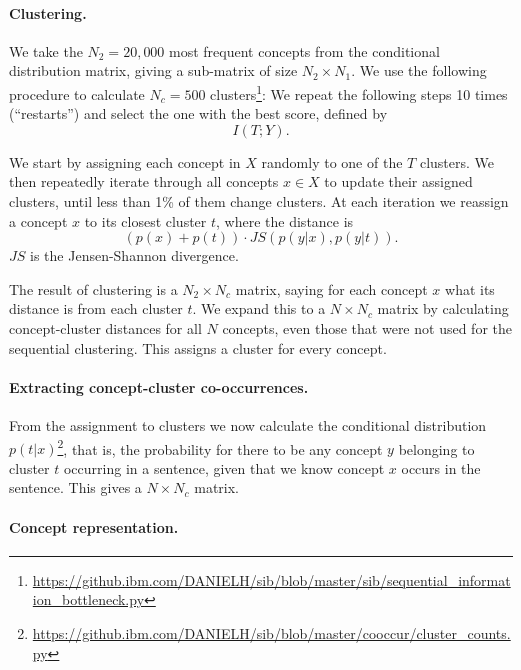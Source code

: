 \documentclass{article}
\begin{document}
    \paragraph{Clustering.}

    We take the $N_2=20,000$ most frequent concepts from the
    conditional distribution matrix, giving a sub-matrix of size $N_2\times N_1$.
    We use the following procedure to calculate $N_c=500$
    clusters\footnote{\url{https://github.ibm.com/DANIELH/sib/blob/master/sib/sequential_information_bottleneck.py}}:
    We repeat the following steps 10 times (``restarts'') and select the one
    with the best score, defined by
    \[
        I(T;Y).
    \]

    We start by assigning each concept in $X$ randomly to one of the $T$ clusters.
    We then repeatedly iterate through all concepts $x\in X$ to update their assigned
    clusters, until less than 1\% of them change clusters.
    At each iteration we reassign a concept $x$ to its closest cluster $t$,
    where the distance is
    \[
        (p(x)+p(t))\cdot JS(p(y|x),p(y|t)).
    \]
    $JS$ is the Jensen-Shannon divergence.

    The result of clustering is a $N_2 \times N_c$ matrix,
    saying for each concept $x$ what its distance is from each cluster $t$.
    We expand this to a $N\times N_c$ matrix by calculating concept-cluster
    distances for all $N$ concepts, even those that were not used for the
    sequential clustering.
    This assigns a cluster for every concept.

    \paragraph{Extracting concept-cluster co-occurrences.}

    From the assignment to clusters we now calculate the conditional distribution
    $p(t|x)$\footnote{\url{https://github.ibm.com/DANIELH/sib/blob/master/cooccur/cluster_counts.py}},
    that is, the probability for there to be any concept $y$ belonging to cluster $t$
    occurring in a sentence, given that we know concept $x$ occurs in the sentence.
    This gives a $N\times N_c$ matrix.

    \paragraph{Concept representation.}
\end{document}
